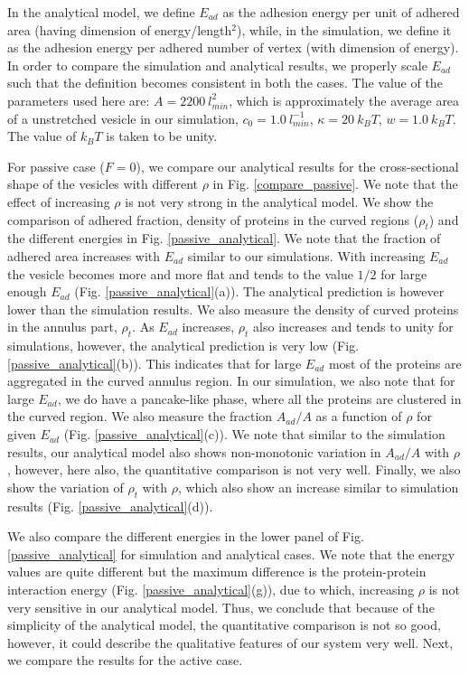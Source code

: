 \documentclass[pre,amsmath]{revtex4}
\begin{document}
In the analytical model, we define $E_{ad}$ as the adhesion energy per unit of adhered area (having dimension of energy/length$^2$), while, in the simulation, we define it as the adhesion energy per adhered number of vertex (with dimension of energy). In order to compare the simulation and analytical results, we properly scale $E_{ad}$ such that the definition becomes consistent in both the cases. The value of the parameters used here are: $A=2200~ l_{min}^2$, which is approximately the average area of a unstretched  vesicle in our simulation, $c_0=1.0 ~l^{-1}_{min}$, $\kappa=20 ~k_B T$, $w=1.0 ~k_B T$. The value of $k_B T$ is taken to be unity.

For passive case ($F=0$), we compare our analytical results for the cross-sectional shape of the vesicles with different $\rho$ in Fig. \ref{compare_passive}. We note that the effect of increasing $\rho$ is not very strong in the analytical model. We show the comparison of adhered fraction, density of proteins in the curved regions ($\rho_t$) and the different energies in Fig. \ref{passive_analytical}. We note that the fraction of adhered area increases with $E_{ad}$ similar to our simulations. With increasing $E_{ad}$ the vesicle becomes more and more flat and tends to the value $1/2$ for large enough $E_{ad}$ (Fig. \ref{passive_analytical}(a)). The analytical prediction is however lower than the simulation results.  We also measure the density of curved proteins in the annulus part, $\rho_t$. As $E_{ad}$ increases, $\rho_t$ also increases and tends to unity for simulations, however, the analytical prediction is very low (Fig. \ref{passive_analytical}(b)). This indicates that for large $E_{ad}$ most of the proteins are aggregated in the curved annulus region. In our simulation, we also note that for large $E_{ad}$, we do have a pancake-like phase, where all the proteins are clustered in the curved region. We also measure the fraction $A_{ad}/A$ as a function  of $\rho$ for given $E_{ad}$ (Fig. \ref{passive_analytical}(c)). We note that similar to the simulation results, our analytical model also shows non-monotonic variation in $A_{ad}/A$ with $\rho$, however, here also, the quantitative comparison is not very well. Finally, we also show the variation of $\rho_t$ with $\rho$, which also show an increase similar to simulation results (Fig. \ref{passive_analytical}(d)). 

We also compare the different energies in the lower panel of Fig. \ref{passive_analytical} for simulation and analytical cases. We note that the energy values are quite different but the maximum difference is the protein-protein interaction energy (Fig. \ref{passive_analytical}(g)), due to which, increasing $\rho$ is not very sensitive in our analytical model. Thus, we conclude that because of the simplicity of the analytical model, the quantitative comparison is not so good, however, it could describe the qualitative features of our system very well. Next, we compare the results for the active case.
\end{document}
